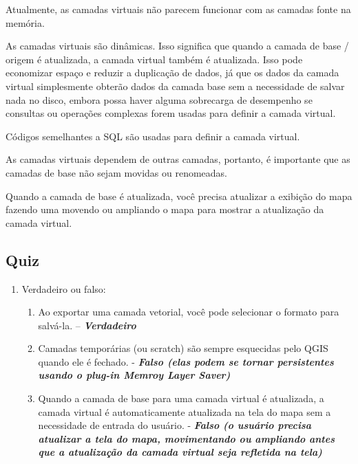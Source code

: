 \documentclass[
]{krantz}
\providecommand{\tightlist}{%
  \setlength{\itemsep}{0pt}\setlength{\parskip}{0pt}}
\begin{document}
Atualmente, as camadas virtuais não parecem funcionar com as camadas fonte na memória.

As camadas virtuais são dinâmicas. Isso significa que quando a camada de base / origem é atualizada, a camada virtual também é atualizada. Isso pode economizar espaço e reduzir a duplicação de dados, já que os dados da camada virtual simplesmente obterão dados da camada base sem a necessidade de salvar nada no disco, embora possa haver alguma sobrecarga de desempenho se consultas ou operações complexas forem usadas para definir a camada virtual.

Códigos semelhantes a SQL são usadas para definir a camada virtual.

As camadas virtuais dependem de outras camadas, portanto, é importante que as camadas de base não sejam movidas ou renomeadas.

Quando a camada de base é atualizada, você precisa atualizar a exibição do mapa fazendo uma movendo ou ampliando o mapa para mostrar a atualização da camada virtual.

\hypertarget{quiz-8}{%
\subsection{Quiz}\label{quiz-8}}

\begin{enumerate}
\def\labelenumi{\arabic{enumi}.}
\item
  Verdadeiro ou falso:

  \begin{enumerate}
  \def\labelenumii{\arabic{enumii}.}
  \tightlist
  \item
    Ao exportar uma camada vetorial, você pode selecionar o formato para salvá-la. -- \textbf{\emph{Verdadeiro}}
  \item
    Camadas temporárias (ou scratch) são sempre esquecidas pelo QGIS quando ele é fechado. - \textbf{\emph{Falso (elas podem se tornar persistentes usando o plug-in Memroy Layer Saver)}}
  \item
    Quando a camada de base para uma camada virtual é atualizada, a camada virtual é automaticamente atualizada na tela do mapa sem a necessidade de entrada do usuário. - \textbf{\emph{Falso (o usuário precisa atualizar a tela do mapa, movimentando ou ampliando antes que a atualização da camada virtual seja refletida na tela)}}
  \end{enumerate}
\end{enumerate}
\end{document}
